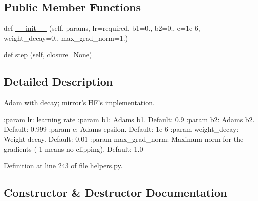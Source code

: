 \subsection*{Public Member Functions}
\begin{DoxyCompactItemize}
\item 
def \hyperlink{classparlai_1_1agents_1_1bert__ranker_1_1helpers_1_1AdamWithDecay_a23ec68b6a5fa73936194b9d1acde8557}{\+\_\+\+\_\+init\+\_\+\+\_\+} (self, params, lr=required, b1=0., b2=0., e=1e-\/6, weight\+\_\+decay=0., max\+\_\+grad\+\_\+norm=1.)
\item 
def \hyperlink{classparlai_1_1agents_1_1bert__ranker_1_1helpers_1_1AdamWithDecay_aeb41188377c1a61b4638228abd6c3e64}{step} (self, closure=None)
\end{DoxyCompactItemize}


\subsection{Detailed Description}
\begin{DoxyVerb}Adam with decay; mirror's HF's implementation.

:param lr:
    learning rate
:param b1:
    Adams b1. Default: 0.9
:param b2:
    Adams b2. Default: 0.999
:param e:
    Adams epsilon. Default: 1e-6
:param weight_decay:
    Weight decay. Default: 0.01
:param max_grad_norm:
    Maximum norm for the gradients (-1 means no clipping).  Default: 1.0
\end{DoxyVerb}
 

Definition at line 243 of file helpers.\+py.



\subsection{Constructor \& Destructor Documentation}
\mbox{\label{classparlai_1_1agents_1_1bert__ranker_1_1helpers_1_1AdamWithDecay_a23ec68b6a5fa73936194b9d1acde8557}} 
